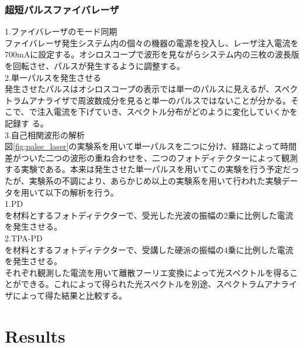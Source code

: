 \documentclass[titlepage]{jsarticle}
\begin{document}



\subsubsection{超短パルスファイバレーザ}
1.ファイバレーザのモード同期\\
    ファイバレーザ発生システム内の個々の機器の電源を投入し、レーザ注入電流を700mAに設定する。オシロスコープで波形を見ながらシステム内の三枚の波長版を回転させ、パルスが発生するように調整する。\\
2.単一パルスを発生させる\\
    発生させたパルスはオシロスコープの表示では単一のパルスに見えるが、スペクトラムアナライザで周波数成分を見ると単一のパルスではないことが分かる。そこで、で注入電流を下げていき、スペクトル分布がどのように変化していくかを記録す
    る。\\
3.自己相関波形の解析\\
    図\ref{fig;palse_laser}の実験系を用いて単一パルスを二つに分け、経路によって時間差がついた二つの波形の重ね合わせを、二つのフォトディテクターによって観測する実験である。本来は発生させた単一パルスを用いてこの実験を行う予定だったが、実験系の不調により、あらかじめ以上の実験系を用いて行われた実験データを用いて以下の解析を行う。\\
    1.PD\\
        を材料とするフォトディテクターで、受光した光波の振幅の2乗に比例した電流を発生させる。\\
    2.TPA-PD\\
        を材料とするフォトディテクターで、受講した硬派の振幅の4乗に比例した電流を発生させる。\\
    それぞれ観測した電流を用いて離散フーリエ変換によって光スペクトルを得ることができる。これによって得られた光スペクトルを別途、スペクトラムアナライザによって得た結果と比較する。\\



\section{Results}
\end{document}

